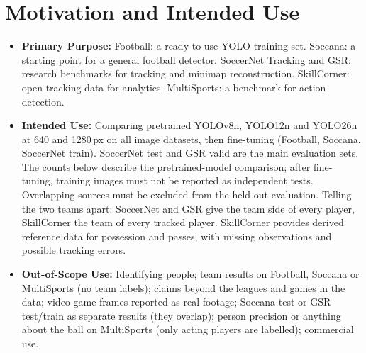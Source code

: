 \documentclass[11pt, a4paper]{article}
\begin{document}
\section{Motivation and Intended Use}
\begin{itemize}
    \item \textbf{Primary Purpose:} Football: a ready-to-use YOLO training set. Soccana: a starting point for a general football detector. SoccerNet Tracking and GSR: research benchmarks for tracking and minimap reconstruction. SkillCorner: open tracking data for analytics. MultiSports: a benchmark for action detection.
    \item \textbf{Intended Use:} Comparing pretrained YOLOv8n, YOLO12n and YOLO26n at 640 and 1280\,px on all image datasets, then fine-tuning (Football, Soccana, SoccerNet train). SoccerNet test and GSR valid are the main evaluation sets. The counts below describe the pretrained-model comparison; after fine-tuning, training images must not be reported as independent tests. Overlapping sources must be excluded from the held-out evaluation. Telling the two teams apart: SoccerNet and GSR give the team side of every player, SkillCorner the team of every tracked player. SkillCorner provides derived reference data for possession and passes, with missing observations and possible tracking errors.
    \item \textbf{Out-of-Scope Use:} Identifying people; team results on Football, Soccana or MultiSports (no team labels); claims beyond the leagues and games in the data; video-game frames reported as real footage; Soccana test or GSR test/train as separate results (they overlap); person precision or anything about the ball on MultiSports (only acting players are labelled); commercial use.
\end{itemize}

\end{document}
